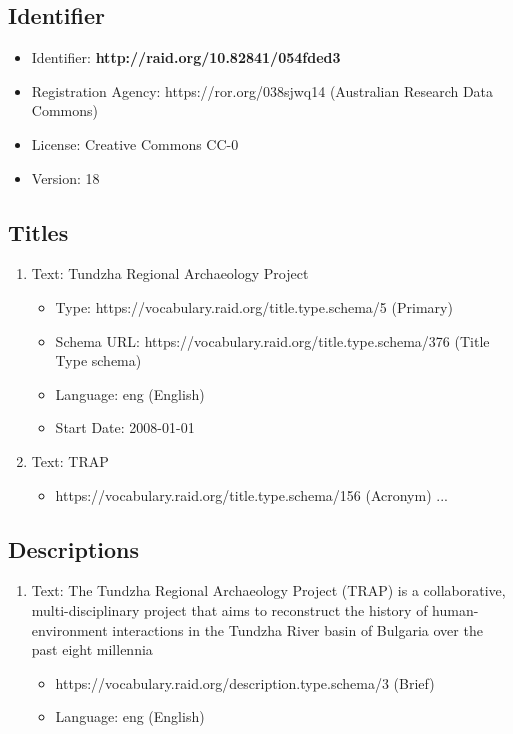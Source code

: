 \begin{framed}

\parbox{0.9\linewidth}{

\subsection*{Identifier}
\begin{itemize}
\item Identifier: \textbf{http://raid.org/10.82841/054fded3}
\item Registration Agency: https://ror.org/038sjwq14 (Australian Research Data Commons)
\item License: Creative Commons CC-0
\item Version: 18
\end{itemize}

\subsection*{Titles}
\begin{enumerate}
\item Text: Tundzha Regional Archaeology Project
   \begin{itemize}
   \item Type: https://vocabulary.raid.org/title.type.schema/5 (Primary)
   \item Schema URL: https://vocabulary.raid.org/title.type.schema/376 (Title Type schema)
   \item Language: eng (English)
   \item Start Date: 2008-01-01
   \end{itemize}

\item Text: TRAP
   \begin{itemize}
   \item https://vocabulary.raid.org/title.type.schema/156 (Acronym) ...
   \end{itemize}
\end{enumerate}

\subsection*{Descriptions}
\begin{enumerate}
\item Text: The Tundzha Regional Archaeology Project (TRAP) is a collaborative, multi-disciplinary project that aims to reconstruct the history of human-environment interactions in the Tundzha River basin of Bulgaria over the past eight millennia
   \begin{itemize}
   \item https://vocabulary.raid.org/description.type.schema/3 (Brief)
   \item Language: eng (English)
   \end{itemize}


\end{enumerate}}
\end{framed}
